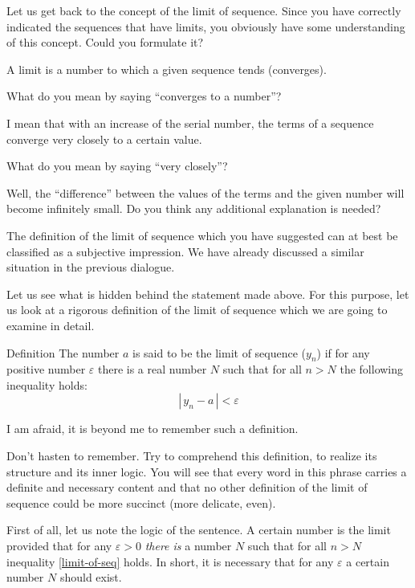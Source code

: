 {Let us get back to the concept of the limit of sequence. Since you have correctly indicated the sequences that have limits, you obviously have some understanding of this concept. Could you formulate it?

\rdr A limit is a number to which a given sequence tends (converges).

\athr What do you mean by saying ``converges to a number''?

\rdr I mean that with an increase of the serial number, the terms of a sequence converge very closely to a certain value.

\athr What do you mean by saying ``very closely''?

\rdr Well, the ``difference'' between the values of the terms and the given number will become infinitely small. Do you think any additional explanation is needed?

\athr The definition of the limit of sequence which you have suggested can at best be classified as a subjective impression. We have already discussed a similar situation in the previous dialogue.

Let us see what is hidden behind the statement made above. For this purpose, let us look at a rigorous definition of the limit of sequence which we are going to examine in detail.
\begin{mytheo}{Definition}
The number $a$ is said to be the limit of sequence ($y_{n}$) if for any positive number $\varepsilon$ there is a real number $N$ such that for all $ n > N$ the following inequality holds:
\begin{equation}%
| \, y_{n} - a \, | < \varepsilon
\label{limit-of-seq}
\end{equation}
\end{mytheo}

\rdr I am afraid, it is beyond me to remember such a definition.

\athr Don't hasten to remember. Try to comprehend this definition, to realize its structure and its inner logic. You will see that every word in this phrase carries a definite and necessary content and that no other definition of the limit of sequence could be more succinct (more delicate, even). 

First of all, let us note the logic of the sentence. A certain number is the limit provided that for any $\varepsilon > 0$ \emph{there is} a number $N$ such that for all $n > N$ inequality \eqref{limit-of-seq} holds. In short, it is necessary that for any $\varepsilon$ a certain number $N$ should exist.

}
